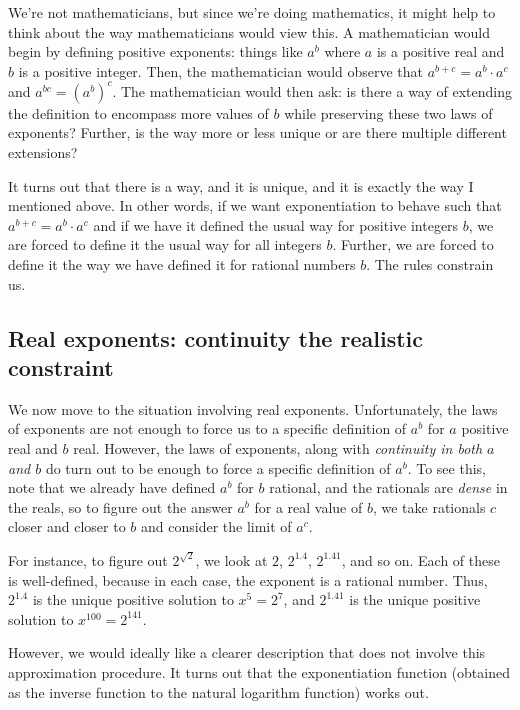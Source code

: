 \documentclass[10pt]{amsart}
\begin{document}
We're not mathematicians, but since we're doing mathematics, it might
help to think about the way mathematicians would view this. A
mathematician would begin by defining positive exponents: things like
$a^b$ where $a$ is a positive real and $b$ is a positive
integer. Then, the mathematician would observe that $a^{b + c} = a^b
\cdot a^c$ and $a^{bc} = (a^b)^c$. The mathematician would then ask:
is there a way of extending the definition to encompass more values of
$b$ while preserving these two laws of exponents? Further, is the way
more or less unique or are there multiple different extensions?

It turns out that there is a way, and it is unique, and it is exactly
the way I mentioned above. In other words, if we want exponentiation
to behave such that $a^{b + c} = a^b \cdot a^c$ and if we have it
defined the usual way for positive integers $b$, we are forced to
define it the usual way for all integers $b$. Further, we are forced
to define it the way we have defined it for rational numbers $b$. The
rules constrain us.

\subsection{Real exponents: continuity the realistic constraint}

We now move to the situation involving real exponents. Unfortunately,
the laws of exponents are not enough to force us to a specific
definition of $a^b$ for $a$ positive real and $b$ real. However, the
laws of exponents, along with {\em continuity in both $a$ and $b$} do
turn out to be enough to force a specific definition of $a^b$. To see
this, note that we already have defined $a^b$ for $b$ rational, and
the rationals are {\em dense} in the reals, so to figure out the
answer $a^b$ for a real value of $b$, we take rationals $c$ closer and
closer to $b$ and consider the limit of $a^c$.

For instance, to figure out $2^{\sqrt{2}}$, we look at $2$, $2^{1.4}$,
$2^{1.41}$, and so on. Each of these is well-defined, because in each
case, the exponent is a rational number. Thus, $2^{1.4}$ is the unique
positive solution to $x^5 = 2^7$, and $2^{1.41}$ is the unique
positive solution to $x^{100} = 2^{141}$. 

However, we would ideally like a clearer description that does not
involve this approximation procedure. It turns out that the
exponentiation function (obtained as the inverse function to the
natural logarithm function) works out.
\end{document}

